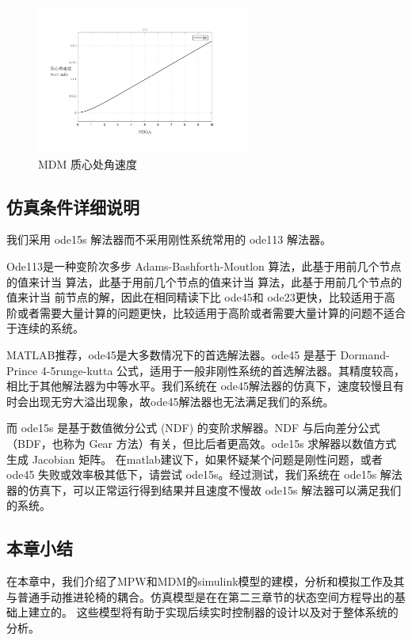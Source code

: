 \begin{itemize}
	\begin{figure}[H]
		\centering
		\includegraphics[width=0.62\textwidth]{fig/simulation/MDM_wCG.pdf}
		\caption{MDM 质心处角速度}\label{MDM_wCG}
	\end{figure}
	
	\clearpage
	\subsection{仿真条件详细说明} 
	
	我们采用 ode15s 解法器而不采用刚性系统常用的 ode113 解法器。 
	
	Ode113是一种变阶次多步 Adams-Bashforth-Moutlon 算法，此基于用前几个节点的值来计当 算法，此基于用前几个节点的值来计当 算法，此基于用前几个节点的值来计当 前节点的解，因此在相同精读下比 ode45和 ode23更快，比较适用于高阶或者需要大量计算的问题更快，比较适用于高阶或者需要大量计算的问题不适合于连续的系统。
	
	MATLAB推荐，ode45是大多数情况下的首选解法器。ode45 是基于 Dormand-Prince 4-5runge-kutta 公式，适用于一般非刚性系统的首选解法器。其精度较高，相比于其他解法器为中等水平。我们系统在 ode45解法器的仿真下，速度较慢且有时会出现无穷大溢出现象，故ode45解法器也无法满足我们的系统。
	
	而 ode15s 是基于数值微分公式 (NDF) 的变阶求解器。NDF 与后向差分公式（BDF，也称为 Gear 方法）有关，但比后者更高效。ode15s 求解器以数值方式生成 Jacobian 矩阵。
	在matlab建议下，如果怀疑某个问题是刚性问题，或者 ode45 失败或效率极其低下，请尝试 ode15s。经过测试，我们系统在 ode15s 解法器的仿真下，可以正常运行得到结果并且速度不慢故 ode15s 解法器可以满足我们的系统。
	
	\subsection{本章小结}
	
	在本章中，我们介绍了MPW和MDM的simulink模型的建模，分析和模拟工作及其与普通手动推进轮椅的耦合。仿真模型是在在第二三章节的状态空间方程导出的基础上建立的。
	这些模型将有助于实现后续实时控制器的设计以及对于整体系统的分析。
	
\end{itemize}
